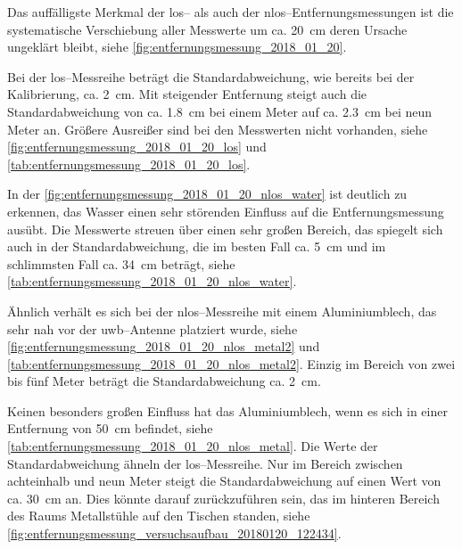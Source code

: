 Das auffälligste Merkmal der \Gls{los}-- als auch der \Gls{nlos}--Entfernungsmessungen ist die systematische Verschiebung aller Messwerte um ca. \SI{20}{\centi\meter} deren Ursache ungeklärt bleibt, siehe \autoref{fig:entfernungsmessung_2018_01_20}.

Bei der \Gls{los}--Messreihe beträgt die Standardabweichung, wie bereits bei der Kalibrierung, ca. \SI{2}{\centi\meter}. Mit steigender Entfernung steigt auch die Standardabweichung von ca. \SI{1.8}{\centi\meter} bei einem Meter auf ca. \SI{2.3}{\centi\meter} bei neun Meter an. Größere Ausreißer sind bei den Messwerten nicht vorhanden, siehe \autoref{fig:entfernungsmessung_2018_01_20_los} und \autoref{tab:entfernungsmessung_2018_01_20_los}.

In der \autoref{fig:entfernungsmessung_2018_01_20_nlos_water} ist deutlich zu erkennen, das Wasser einen sehr störenden Einfluss auf die Entfernungsmessung ausübt. Die Messwerte streuen über einen sehr großen Bereich, das spiegelt sich auch in der Standardabweichung, die im besten Fall ca. \SI{5}{\centi\meter} und im schlimmsten Fall ca. \SI{34}{\centi\meter} beträgt, siehe \autoref{tab:entfernungsmessung_2018_01_20_nlos_water}.

Ähnlich verhält es sich bei der \Gls{nlos}--Messreihe mit einem Aluminiumblech, das sehr nah vor der \Gls{uwb}--Antenne platziert wurde, siehe \autoref{fig:entfernungsmessung_2018_01_20_nlos_metal2} und \autoref{tab:entfernungsmessung_2018_01_20_nlos_metal2}. Einzig im Bereich von zwei bis fünf Meter beträgt die Standardabweichung ca. \SI{2}{\centi\meter}.

Keinen besonders großen Einfluss hat das Aluminiumblech, wenn es sich in einer Entfernung von \SI{50}{\centi\meter} befindet, siehe \autoref{tab:entfernungsmessung_2018_01_20_nlos_metal}. Die Werte der Standardabweichung ähneln der \Gls{los}--Messreihe. Nur im Bereich zwischen achteinhalb und neun Meter steigt die Standardabweichung auf einen Wert von ca. \SI{30}{\centi\meter} an. Dies könnte darauf zurückzuführen sein, das im hinteren Bereich des Raums Metallstühle auf den Tischen standen, siehe \autoref{fig:entfernungsmessung_versuchsaufbau_20180120_122434}.


